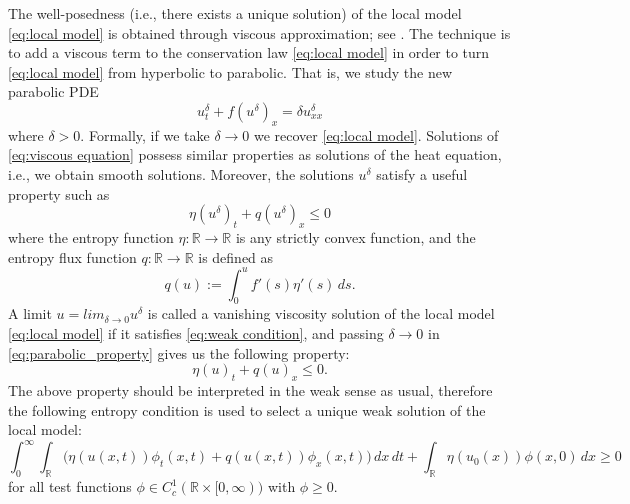 The well-posedness (i.e., there exists a unique solution) of the local model \eqref{eq:local model} is obtained through viscous approximation; see \cite[Chapter~2]{holdenFrontTrackingHyperbolic2015}. The technique is to add a viscous term to the conservation law \eqref{eq:local model} in order to turn \eqref{eq:local model} from hyperbolic to parabolic. That is, we study the new parabolic PDE
\begin{equation}\label{eq:viscous equation}
    u^{\delta}_{t} + f(u^{\delta})_{x} = \delta u^{\delta}_{xx}
\end{equation}
where $\delta > 0$. Formally, if we take $\delta \rightarrow 0$ we recover \eqref{eq:local model}. Solutions of \eqref{eq:viscous equation} possess similar properties as solutions of the heat equation, i.e., we obtain smooth solutions. Moreover, the solutions $u^{\delta}$ satisfy a useful property such as
\begin{equation}\label{eq:parabolic_property}
    \eta(u^{\delta})_{t} + q(u^{\delta})_{x} \leq 0
\end{equation}
where the entropy function $\eta:\mathbb{R}\rightarrow\mathbb{R}$ is any  strictly convex function, and the entropy flux function $q:\mathbb{R}\rightarrow\mathbb{R}$ is defined as
\[ q(u) := \int_{0}^{u} f'(s)\eta'(s) \, ds.\]
A limit $u= lim_{\delta \rightarrow 0} u^{\delta}$ is called a vanishing viscosity solution of the local model \eqref{eq:local model} if it satisfies \eqref{eq:weak condition}, and passing $\delta \rightarrow 0 $ in \eqref{eq:parabolic_property} gives us the following property:
\begin{equation}\label{eq:hyperbolic_property}
    \eta(u)_{t} + q(u)_{x} \leq 0.
\end{equation}
The above property should be interpreted in the weak sense as usual, therefore the following entropy condition is used to select a unique weak solution of the local model:
\begin{equation}\label{eq:enropy_condition}
    \int_0^\infty \int_{\mathbb{R}}
    \bigl(\eta(u(x,t)) \phi_t(x,t) + q(u(x,t)) \phi_x(x,t)\bigr)\, dx\, dt
    + \int_{\mathbb{R}} \eta(u_0(x)) \phi(x,0)\, dx
    \ge 0
\end{equation}
for all test functions $\phi \in C_c^1(\mathbb{R}\times[0,\infty))$ with $\phi \ge 0$.

